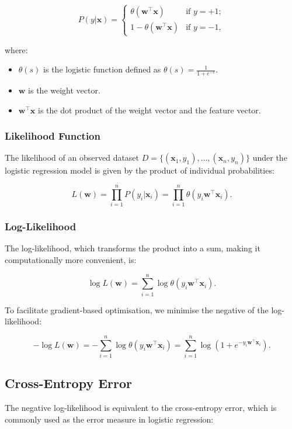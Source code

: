 \[
P(y|\mathbf{x}) = 
\begin{cases}
\theta(\mathbf{w}^\top\mathbf{x}) & \text{if } y = +1;\\
1 - \theta(\mathbf{w}^\top\mathbf{x}) & \text{if } y = -1,
\end{cases}
\]

where:
\begin{itemize}
    \item \( \theta(s) \) is the logistic function defined as \( \theta(s) = \frac{1}{1 + e^{-s}} \).
    \item \( \mathbf{w} \) is the weight vector.
    \item \( \mathbf{w}^\top\mathbf{x} \) is the dot product of the weight vector and the feature vector.
\end{itemize}

\subsubsection*{Likelihood Function}
The likelihood of an observed dataset \( D = \{(\mathbf{x}_1, y_1), \ldots, (\mathbf{x}_n, y_n)\} \) under the logistic regression model is given by the product of individual probabilities:

\[
L(\mathbf{w}) = \prod_{i=1}^{n} P(y_i|\mathbf{x}_i) = \prod_{i=1}^{n} \theta(y_i\mathbf{w}^\top\mathbf{x}_i).
\]

\subsubsection*{Log-Likelihood}
The log-likelihood, which transforms the product into a sum, making it computationally more convenient, is:

\[
\log L(\mathbf{w}) = \sum_{i=1}^{n} \log \theta(y_i\mathbf{w}^\top\mathbf{x}_i).
\]

To facilitate gradient-based optimisation, we minimise the negative of the log-likelihood:

\[
-\log L(\mathbf{w}) = -\sum_{i=1}^{n} \log \theta(y_i\mathbf{w}^\top\mathbf{x}_i) = \sum_{i=1}^{n} \log \left(1 + e^{-y_i\mathbf{w}^\top\mathbf{x}_i}\right).
\]

\subsection{Cross-Entropy Error}
The negative log-likelihood is equivalent to the cross-entropy error, which is commonly used as the error measure in logistic regression:

